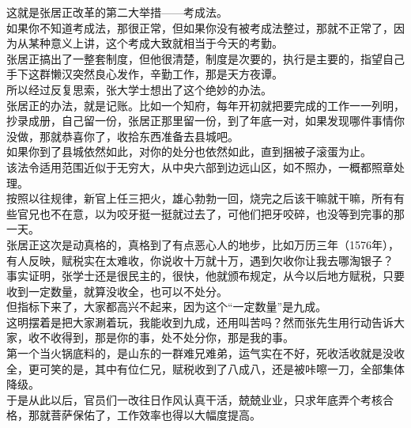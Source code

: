 \begin{multicols}{\theparacolNo}
这就是张居正改革的第二大举措——考成法。\\

如果你不知道考成法，那很正常，但如果你没有被考成法整过，那就不正常了，因为从某种意义上讲，这个考成大致就相当于今天的考勤。\\

张居正搞出了一整套制度，但他很清楚，制度是次要的，执行是主要的，指望自己手下这群懒汉突然良心发作，辛勤工作，那是天方夜谭。\\

所以经过反复思索，张大学士想出了这个绝妙的办法。\\

张居正的办法，就是记账。比如一个知府，每年开初就把要完成的工作一一列明，抄录成册，自己留一份，张居正那里留一份，到了年底一对，如果发现哪件事情你没做，那就恭喜你了，收拾东西准备去县城吧。\\

如果你到了县城依然如此，对你的处分也依然如此，直到捆被子滚蛋为止。\\

该法令适用范围近似于无穷大，从中央六部到边远山区，如不照办，一概都照章处理。\\

按照以往规律，新官上任三把火，雄心勃勃一回，烧完之后该干嘛就干嘛，所有有些官兄也不在意，以为咬牙挺一挺就过去了，可他们把牙咬碎，也没等到完事的那一天。\\

张居正这次是动真格的，真格到了有点恶心人的地步，比如万历三年（1576年），有人反映，赋税实在太难收，你说收十万就十万，遇到欠收你让我去哪淘银子？\\

事实证明，张学士还是很民主的，很快，他就颁布规定，从今以后地方赋税，只要收到一定数量，就算没收全，也可以不处分。\\

但指标下来了，大家都高兴不起来，因为这个“一定数量”是九成。\\

这明摆着是把大家涮着玩，我能收到九成，还用叫苦吗？然而张先生用行动告诉大家，收不收得到，那是你的事，处不处分你，那是我的事。\\

第一个当火锅底料的，是山东的一群难兄难弟，运气实在不好，死收活收就是没收全，更可笑的是，其中有位仁兄，赋税收到了八成八，还是被咔嚓一刀，全部集体降级。\\

于是从此以后，官员们一改往日作风认真干活，兢兢业业，只求年底弄个考核合格，那就菩萨保佑了，工作效率也得以大幅度提高。\\


\end{multicols}
